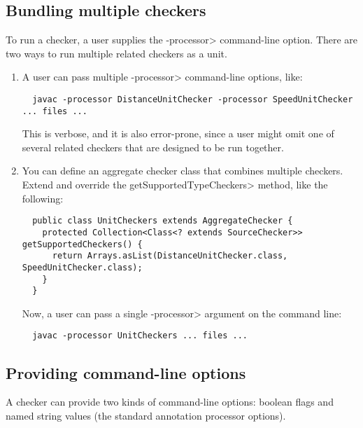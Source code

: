 \subsection{Bundling multiple checkers\label{bundling-multiple-checkers}}

To run a checker, a user supplies the \<-processor> command-line option.
There are two ways to run multiple related checkers as a unit.

\begin{enumerate}
\item
A user can pass
multiple \<-processor> command-line options, like:

\begin{Verbatim}
  javac -processor DistanceUnitChecker -processor SpeedUnitChecker ... files ...
\end{Verbatim}

\noindent
This is verbose, and it is also error-prone, since a user might omit one of
several related checkers that are designed to be run together.

\item
You can define an aggregate checker class that combines
multiple checkers.  Extend  and override
the \<getSupportedTypeCheckers> method, like the following:

\begin{Verbatim}
  public class UnitCheckers extends AggregateChecker {
    protected Collection<Class<? extends SourceChecker>> getSupportedCheckers() {
      return Arrays.asList(DistanceUnitChecker.class, SpeedUnitChecker.class);
    }
  }
\end{Verbatim}

\noindent
Now, a user can pass a single \<-processor> argument on the command line:

\begin{Verbatim}
  javac -processor UnitCheckers ... files ...
\end{Verbatim}

\end{enumerate}



\subsection{Providing command-line options\label{providing-command-line-options}}

A checker can provide two kinds of command-line options:
boolean flags and
named string values (the standard annotation processor
options).

